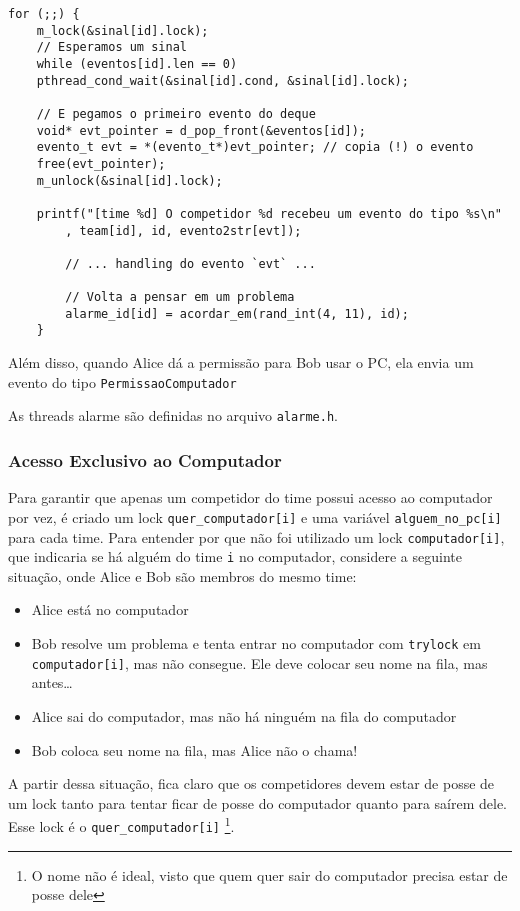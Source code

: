 \documentclass[11pt]{article}
\newcommand{\code}{\lstinline[mathescape=true]}
\begin{document}
\begin{lstlisting}[caption=Implementação da espera por um evento no código do competidor]
for (;;) {
	m_lock(&sinal[id].lock);
	// Esperamos um sinal
	while (eventos[id].len == 0)
	pthread_cond_wait(&sinal[id].cond, &sinal[id].lock);

	// E pegamos o primeiro evento do deque
	void* evt_pointer = d_pop_front(&eventos[id]);
	evento_t evt = *(evento_t*)evt_pointer; // copia (!) o evento
	free(evt_pointer);
	m_unlock(&sinal[id].lock);

	printf("[time %d] O competidor %d recebeu um evento do tipo %s\n"
		, team[id], id, evento2str[evt]);

		// ... handling do evento `evt` ...

		// Volta a pensar em um problema
		alarme_id[id] = acordar_em(rand_int(4, 11), id);
	}
	\end{lstlisting}

	Além disso, quando Alice dá a permissão para Bob usar o PC, ela envia um evento do tipo
	\code{PermissaoComputador} 

	As threads alarme são definidas no arquivo \code{alarme.h}. 

	\subsubsection{Acesso Exclusivo ao Computador}
	Para garantir que apenas um competidor do time possui acesso ao computador por vez, é criado um lock
	\code{quer_computador[i]} e uma variável \code{alguem_no_pc[i]} para cada time. Para entender por que
	não foi utilizado um lock \code{computador[i]}, que indicaria se há alguém do time \code{i} no
	computador, considere a seguinte situação, onde Alice e Bob são membros do mesmo time:

	\begin{itemize}
		\item Alice está no computador
		\item Bob resolve um problema e tenta entrar no computador com \code{trylock} em
			\code{computador[i]}, mas não consegue. Ele deve colocar seu nome na fila, mas antes\dots
		\item Alice sai do computador, mas não há ninguém na fila do computador
		\item Bob coloca seu nome na fila, mas Alice não o chama!
	\end{itemize}

	A partir dessa situação, fica claro que os competidores devem estar de posse de um lock tanto para
	tentar ficar de posse do computador quanto para saírem dele. Esse lock é o \code{quer_computador[i]}
	\footnote{O nome não é ideal, visto que quem quer sair do computador precisa estar de posse dele}.
\end{document}
